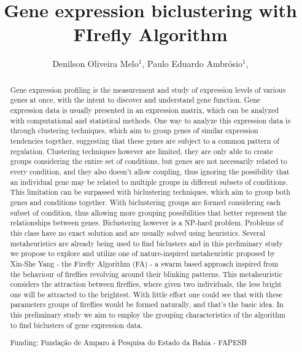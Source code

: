 \documentclass[twoside]{article}
\title{\vspace{-15mm}\fontsize{24pt}{10pt}\selectfont\textbf{ Gene expression biclustering with FIrefly Algorithm }} %
\author{ Denilson Oliveira Melo$^{1}$, Paulo Eduardo Ambrósio$^{1}$, }
\affil{ 1 Universidade Estadual de Santa Cruz

 }
\date{}
\begin{document}
  
  
  \maketitle %
  
  
  \thispagestyle{fancy} %
  
  
  \begin{abstract}
  Gene expression profiling is the measurement and study of expression levels of various genes at once, with the intent to discover and understand gene function. Gene expression data is usually presented in an expression matrix, which can be  analyzed with computational and statistical methods. One way to analyze this expression data is through clustering techniques, which aim to group genes of similar expression tendencies together, suggesting that these genes are subject to a common pattern of regulation. Clustering techniques however are limited, they are only able to create groups considering the entire set of conditions, but genes are not necessarily related to every condition, and they also doesn't allow coupling, thus ignoring the possibility that an individual gene may be related to multiple groups in different subsets of conditions. This limitation can be surpassed with biclustering techniques, which aim to group both genes and conditions together. With biclustering groups are formed considering each subset of condition, thus allowing more grouping possibilities that better represent the relationships between genes. Biclustering however is a NP-hard problem. Problems of this class have no exact solution and are usually solved using heuristics. Several metaheuristics are already being used to find biclusters and in this preliminary study we propose to explore and utilize one of nature-inspired metaheuristic proposed by Xin-She Yang - the Firefly Algorithm (FA) - a swarm based approach inspired from the behaviour of fireflies revolving around their blinking patterns. This metaheuristic considers the attraction between fireflies, where given two individuals, the less bright one will be attracted to the brightest. With little effort one could see that with these parameters groups of fireflies would be formed naturally, and that's the basic idea. In this preliminary study we aim to employ the grouping characteristics of the algorithm to find biclusters of gene expression data.
  
  Funding: Funda\c{c}\~ao de Amparo \`a Pesquisa do Estado da Bahia - FAPESB \\ 
  \end{abstract}
  
\end{document}
